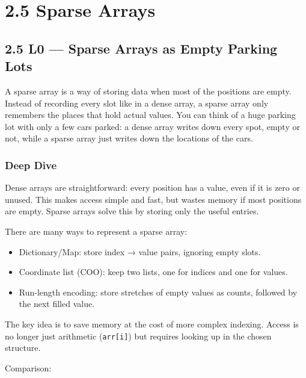 \documentclass[
  letterpaper,
  DIV=11,
  numbers=noendperiod]{scrreprt}
\providecommand{\tightlist}{%
  \setlength{\itemsep}{0pt}\setlength{\parskip}{0pt}}
\begin{document}
\section{2.5 Sparse Arrays}\label{sparse-arrays}

\subsection{2.5 L0 --- Sparse Arrays as Empty Parking
Lots}\label{l0-sparse-arrays-as-empty-parking-lots}

A sparse array is a way of storing data when most of the positions are
empty. Instead of recording every slot like in a dense array, a sparse
array only remembers the places that hold actual values. You can think
of a huge parking lot with only a few cars parked: a dense array writes
down every spot, empty or not, while a sparse array just writes down the
locations of the cars.

\subsubsection{Deep Dive}\label{deep-dive-15}

Dense arrays are straightforward: every position has a value, even if it
is zero or unused. This makes access simple and fast, but wastes memory
if most positions are empty. Sparse arrays solve this by storing only
the useful entries.

There are many ways to represent a sparse array:

\begin{itemize}
\tightlist
\item
  Dictionary/Map: store index → value pairs, ignoring empty slots.
\item
  Coordinate list (COO): keep two lists, one for indices and one for
  values.
\item
  Run-length encoding: store stretches of empty values as counts,
  followed by the next filled value.
\end{itemize}

The key idea is to save memory at the cost of more complex indexing.
Access is no longer just arithmetic (\texttt{arr{[}i{]}}) but requires
looking up in the chosen structure.

Comparison:
\end{document}
